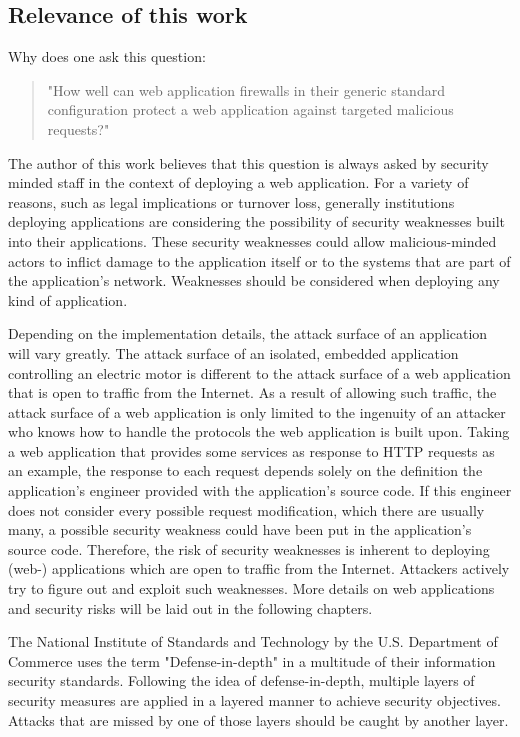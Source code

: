 \subsection{Relevance of this work}
Why does one ask this question:
\begin{quote} "How well can web application firewalls in their generic standard configuration protect a web application against targeted malicious requests?" 
\end{quote}
The author of this work believes that this question is always asked by security minded staff in the context of deploying a web application.
For a variety of reasons, such as legal implications or turnover loss, generally institutions deploying applications are considering the possibility of security weaknesses built into their applications. These security weaknesses could allow malicious-minded actors to inflict damage to the application itself or to the systems that are part of the application's network.
Weaknesses should be considered when deploying any kind of application.

Depending on the implementation details, the attack surface of an application will vary greatly. The attack surface of an isolated, embedded application controlling an electric motor is different to the attack surface of a web application that is open to traffic from the Internet. As a result of allowing such traffic, the attack surface of a web application is only limited to the ingenuity of an attacker who knows how to handle the protocols the web application is built upon.
Taking a web application that provides some services as response to HTTP requests as an example, the response to each request depends solely on the definition the application's engineer provided with the application's source code. If this engineer does not consider every possible request modification, which there are usually many, a possible security weakness could have been put in the application's source code. Therefore, the risk of security weaknesses is inherent to deploying (web-) applications which are open to traffic from the Internet. Attackers actively try to figure out and exploit such weaknesses. More details on web applications and security risks will be laid out in the following chapters.

The National Institute of Standards and Technology by the U.S. Department of Commerce uses the term "Defense-in-depth" in a multitude of their information security standards. 
Following the idea of defense-in-depth, multiple layers of security measures are applied in a layered manner to achieve security objectives. Attacks that are missed by one of those layers should be caught by another layer. \cite{nist/did}

